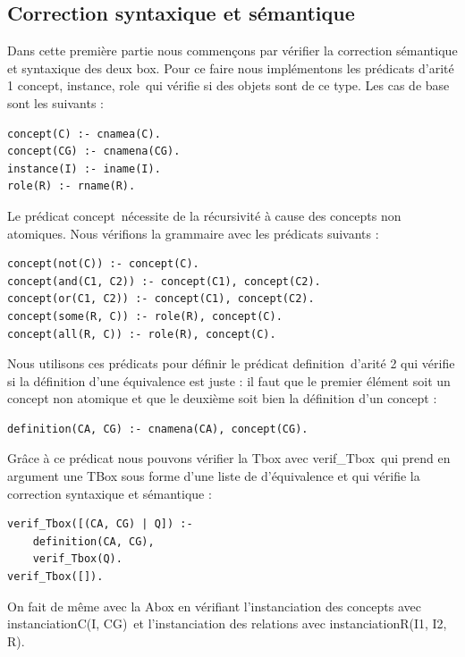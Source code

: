 \documentclass{article}
\begin{document}
\subsection{Correction syntaxique et sémantique}
Dans cette première partie nous commençons par vérifier la correction sémantique et syntaxique des deux box. Pour ce faire nous implémentons les prédicats d'arité 1 \color{blue}concept, instance, role\color{black}\ qui vérifie si des objets sont de ce type. Les cas de base sont les suivants :

\begin{verbatim}
concept(C) :- cnamea(C).
concept(CG) :- cnamena(CG). 
instance(I) :- iname(I).
role(R) :- rname(R). 
\end{verbatim}

Le prédicat \color{blue}concept\color{black}\ nécessite de la récursivité à cause des concepts non atomiques. Nous vérifions la grammaire avec les prédicats suivants :

\begin{verbatim}
concept(not(C)) :- concept(C).
concept(and(C1, C2)) :- concept(C1), concept(C2).
concept(or(C1, C2)) :- concept(C1), concept(C2).
concept(some(R, C)) :- role(R), concept(C).
concept(all(R, C)) :- role(R), concept(C).
\end{verbatim}

Nous utilisons ces prédicats pour définir le prédicat \color{blue}definition\color{black}\ d'arité 2 qui vérifie si la définition d'une équivalence est juste : il faut que le premier élément soit un concept non atomique et que le deuxième soit bien la définition d'un concept :
\begin{verbatim}
definition(CA, CG) :- cnamena(CA), concept(CG).
\end{verbatim}

Grâce à ce prédicat nous pouvons vérifier la Tbox avec \color{blue}verif\_Tbox\color{black}\ qui prend en argument une TBox sous forme d'une liste de d'équivalence et qui vérifie la correction syntaxique et sémantique : 
\begin{verbatim}
verif_Tbox([(CA, CG) | Q]) :- 
    definition(CA, CG), 
    verif_Tbox(Q).
verif_Tbox([]).
\end{verbatim}
On fait de même avec la Abox en vérifiant l'instanciation des concepts avec \color{blue}instanciationC(I, CG)\color{black}\ et l'instanciation des relations avec \color{blue}instanciationR(I1, I2, R)\color{black}.
\end{document}
